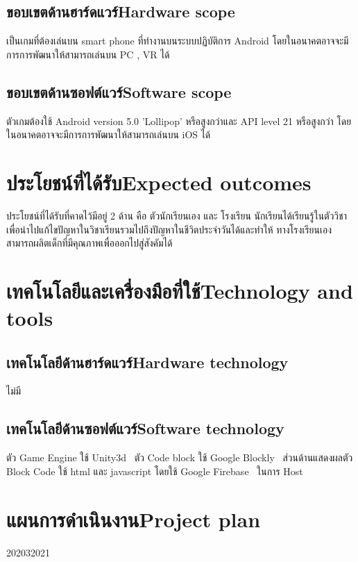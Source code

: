 \subsection{\ifcpe ขอบเขตด้านฮาร์ดแวร์\else Hardware scope\fi}
เป็นเกมที่ต้องเล่นบน smart phone ที่ทำงานบนระบบปฏิบัติการ Android โดยในอนาคตอาจจะมีการการพัฒนาให้สามารถเล่นบน PC , VR ได้

\subsection{\ifcpe ขอบเขตด้านซอฟต์แวร์\else Software scope\fi}
ตัวเกมต้องใช้ Android version 5.0 'Lollipop' หรือสูงกว่าและ API level 21 หรือสูงกว่า
โดยในอนาคตอาจจะมีการการพัฒนาให้สามารถเล่นบน iOS ได้

\section{\ifcpe ประโยชน์ที่ได้รับ\else Expected outcomes\fi}
ประโยชน์ที่ได้รับที่คาดไว้มีอยู่ 2 ด้าน คือ ตัวนักเรียนเอง และ โรงเรียน นักเรียนได้เรียนรู้ในตัววิชาเพื่อนำไปแก้ไขปัญหาในวิชาเรียนรวมไปถึงปัญหาในชีวิตประจำวันได้และทำให้
ทางโรงเรียนเองสามารถผลิตเด็กที่มีคุณภาพเพื่อออกไปสู่สังคัมได้

\section{\ifcpe เทคโนโลยีและเครื่องมือที่ใช้\else Technology and tools\fi}

\subsection{\ifcpe เทคโนโลยีด้านฮาร์ดแวร์\else Hardware technology\fi}
ไม่มี

\subsection{\ifcpe เทคโนโลยีด้านซอฟต์แวร์\else Software technology\fi}
ตัว Game Engine ใช้ Unity3d~\cite{utb,ud} ตัว Code block ใช้ Google Blockly~\cite{gb}
ส่วนด้านแสดงผลตัว Block Code ใช้ html และ javascript โดยใช้ Google Firebase~\cite{fb} ในการ Host

\section{\ifcpe แผนการดำเนินงาน\else Project plan\fi}
\begin{plan}{7}{2020}{3}{2021}
\end{plan}

